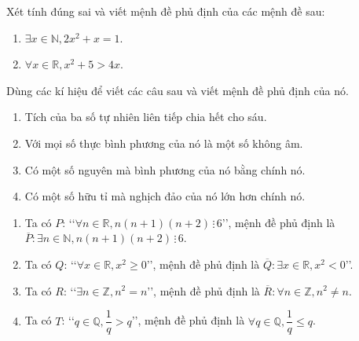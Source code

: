 \begin{bt}%
	Xét tính đúng sai và viết mệnh đề phủ định của các mệnh đề sau:
	\begin{enumerate}
		\item  $\exists x \in \mathbb{N},2x^2+x=1$.
		\item  $\forall x \in \mathbb{R},x^2+5>4x$.
	\end{enumerate}
\end{bt}

\begin{bt}%
	Dùng các kí hiệu để viết các câu sau và viết mệnh đề phủ định của nó.
	\begin{enumerate}
		\item[a)] Tích của ba số tự nhiên liên tiếp chia hết cho sáu.
		\item[b)] Với mọi số thực bình phương của nó là một số không âm.
		\item[c)] Có một số nguyên mà bình phương của nó bằng chính nó.
		\item[d)] Có một số hữu tỉ mà nghịch đảo của nó lớn hơn chính nó.
	\end{enumerate}
	\loigiai
	{
		\begin{enumerate}
			\item[a)] Ta có $P$: \lq\lq$\forall n\in\mathbb{R}, n(n+1)(n+2)\,\vdots\,6$\rq\rq, mệnh đề phủ định là $\overline{P}:\exists n\in\mathbb{N},n(n+1)(n+2)\,\vdots\,6$.
			\item[b)] Ta có $Q$: \lq\lq$ \forall x\in\mathbb{R},x^2\ge0$\rq\rq, mệnh đề phủ định là $\overline{Q}: \exists x\in\mathbb{R},x^2<0$\rq\rq.
			\item[c)] Ta có $ R $: \lq\lq$ \exists n\in\mathbb{Z},n^2=n$\rq\rq, mệnh đề phủ định là $\overline{R}:\forall n\in\mathbb{Z},n^2\ne n$.
			\item[d)] Ta có $T$: \lq\lq$q\in\mathbb{Q},\dfrac{1}{q}>q$\rq\rq, mệnh đề phủ định là $\forall q\in\mathbb{Q},\dfrac{1}{q}\le q$.
		\end{enumerate}	
	}
\end{bt}

